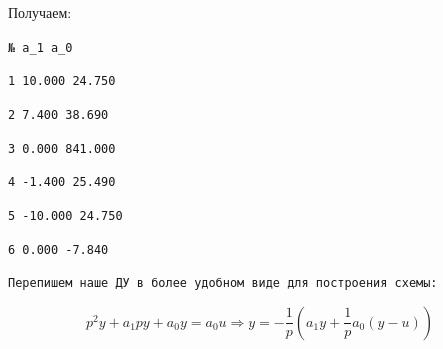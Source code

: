\begin{par}
\begin{flushleft}
Получаем:
\end{flushleft}
\end{par}

\begin{par}
\begin{flushleft}
\texttt{№  a\_1		 a\_0}
\end{flushleft}
\end{par}

\begin{par}
\begin{flushleft}
\texttt{1  10.000	 24.750}
\end{flushleft}
\end{par}

\begin{par}
\begin{flushleft}
\texttt{2   7.400	 38.690}
\end{flushleft}
\end{par}

\begin{par}
\begin{flushleft}
\texttt{3   0.000	841.000}
\end{flushleft}
\end{par}

\begin{par}
\begin{flushleft}
\texttt{4  -1.400	 25.490}
\end{flushleft}
\end{par}

\begin{par}
\begin{flushleft}
\texttt{5 -10.000	 24.750}
\end{flushleft}
\end{par}

\begin{par}
\begin{flushleft}
\texttt{6   0.000	 -7.840}
\end{flushleft}
\end{par}

\begin{par}
\begin{flushleft}
\texttt{Перепишем наше ДУ в более удобном виде для построения схемы:}
\end{flushleft}
\end{par}

\begin{par}
$$p^2 y+a_1 py+a_0 y=a_0 u\Rightarrow y=-\frac{1}{p}(a_1 y+\frac{1}{p}a_0 (y-u))$$
\end{par}

